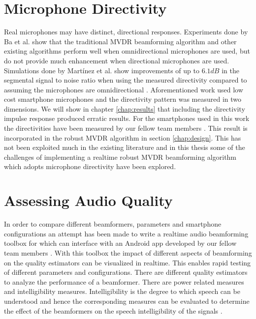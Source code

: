\section{Microphone Directivity}
\label{sec:intro_directivity}
Real microphones may have distinct, directional responses. Experiments done by Ba et al. \citep{ba2007} show that the traditional MVDR beamforming algorithm and other existing algorithms perform well when omnidirectional microphones are used, but do not provide much enhancement when directional microphones are used. Simulations done by Martínez et al. \cite{gaubitch2014} show improvements of up to $6.1 dB$ in the segmental signal to noise ratio when using the measured directivity compared to assuming the microphones are omnidirectional \citep{martinez2015}. Aforementioned work used low cost smartphone microphones and the directivity pattern was measured in two dimensions. 
We will show in chapter \ref{chap:results} that including the directivity impulse response produced erratic results.
For the smartphones used in this work the directivities have been measured by our fellow team members \cite{BAP:RosalieTim}. This result is incorporated in the robust MVDR algorithm in section \ref{chap:design}. This has not been exploited much in the existing literature and in this thesis some of the challenges of implementing a realtime robust MVDR beamforming algorithm which adopts microphone directivity have been explored.

\section{Assessing Audio Quality}
\label{sec:intro_intelligibility}
In order to compare different beamformers, parameters and smartphone configurations an attempt has been made to write a realtime audio beamforming toolbox for \matlab which can interface with an Android app developed by our fellow team members \cite{BAP:RoySjoerd}. With this toolbox the impact of different aspects of beamforming on the quality estimators can be visualized in realtime. This enables rapid testing of different parameters and configurations. There are different quality estimators to analyze the performance of a beamformer. There are power related measures and intelligibility measures. Intelligibility is the degree to which speech can be understood and hence the corresponding measures can be evaluated to determine the effect of the beamformers on the speech intelligibility of the signals \cite{gerrits2014evaluation}.

